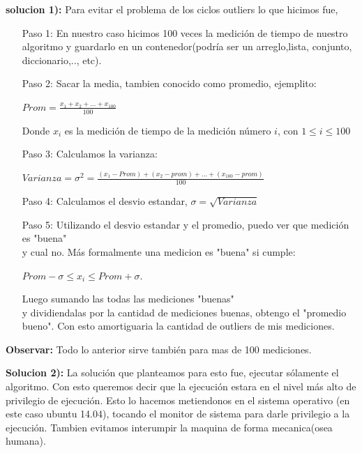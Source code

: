 \documentclass[a4paper]{article}
\begin{document}
\textbf{solucion 1):} Para evitar el problema de los ciclos outliers lo que hicimos fue,

\begin{itemize}
	\item[Paso 1:] En nuestro caso hicimos 100 veces la medición de tiempo de nuestro algoritmo y guardarlo en un contenedor(podría ser un arreglo,lista, conjunto, diccionario,.., etc).
	\item[Paso 2:] Sacar la media, tambien conocido como promedio, ejemplito:
		\begin{center} $ Prom =\frac{x_1+x_2+...+x_{100}}{100}$ \end{center}
		Donde $x_i$ es la medición de tiempo de la medición número $i$, con $1 \leq i \leq 100$ 
	\item[Paso 3:] Calculamos la varianza: 			
				\begin{center}
					$Varianza = \sigma^2 = \frac{(x_1 - Prom)+ (x_2 - prom)+ ...+ (x_{100} - prom)}{100} $
				\end{center}
	\item[Paso 4:] Calculamos el desvio estandar,  $\sigma = \sqrt{Varianza}$
	\item[Paso 5:] Utilizando el desvio estandar y el promedio, puedo ver que medición es "buena"  \\ y cual no. Más formalmente una medicion es "buena" si cumple: 
					\begin{center}
					$Prom - \sigma \leq x_i \leq Prom + \sigma $. %
					\end{center}
	 Luego sumando las todas las mediciones  "buenas" \\ y dividiendalas por la cantidad de mediciones buenas, obtengo el "promedio bueno". Con esto amortiguaria la cantidad de outliers de mis mediciones. 			
\end{itemize}

\textbf{Observar:} Todo lo anterior sirve también para mas de 100 mediciones. \newline

\textbf{Solucion 2):} La solución que planteamos para esto fue, ejecutar sólamente el algoritmo. Con esto queremos decir que la ejecución estara en el nivel más alto de privilegio de ejecución. Esto lo hacemos metiendonos en el sistema operativo (en este caso ubuntu 14.04), tocando el monitor de sistema para darle privilegio a la ejecución. Tambien evitamos interumpir la maquina de forma mecanica(osea humana).  
\end{document}
